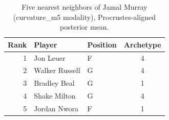 \begin{table}[htbp]
  \centering\small
  \begin{tabular}{rllc}
    \toprule
    Rank & Player & Position & Archetype \\
    \midrule
    1 & Jon Leuer & F & 4 \\
    2 & Walker Russell & G & 4 \\
    3 & Bradley Beal & G & 1 \\
    4 & Shake Milton & G & 4 \\
    5 & Jordan Nwora & F & 1 \\
    \bottomrule
  \end{tabular}
  \caption{Five nearest neighbors of Jamal Murray (curvature_m5 modality), Procrustes-aligned posterior mean.}
  \label{tab:Jamal_Murray_neighbors_curvature_m5}
\end{table}

